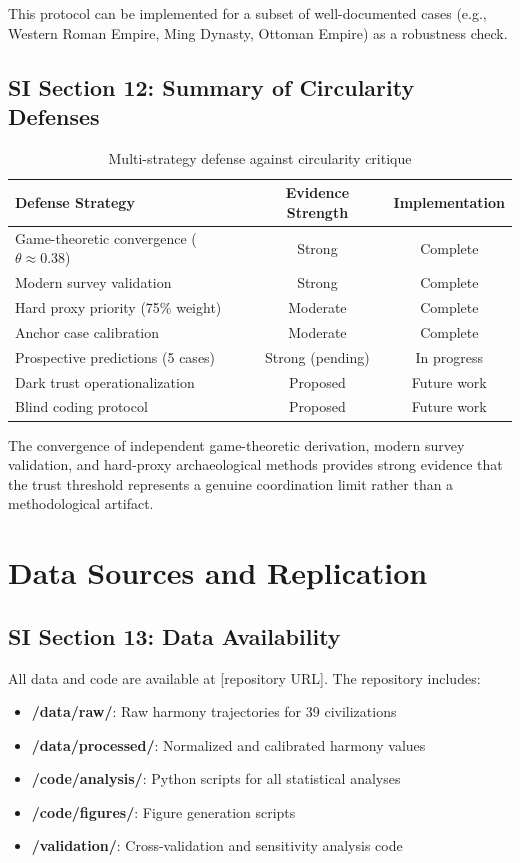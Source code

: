 \documentclass[11pt,a4paper]{article}
\begin{document}
This protocol can be implemented for a subset of well-documented cases (e.g., Western Roman Empire, Ming Dynasty, Ottoman Empire) as a robustness check.

\subsection{SI Section 12: Summary of Circularity Defenses}

\begin{table}[H]
\centering
\caption{Multi-strategy defense against circularity critique}
\begin{tabular}{lcc}
\toprule
\textbf{Defense Strategy} & \textbf{Evidence Strength} & \textbf{Implementation} \\
\midrule
Game-theoretic convergence ($\theta \approx 0.38$) & Strong & Complete \\
Modern survey validation & Strong & Complete \\
Hard proxy priority (75\% weight) & Moderate & Complete \\
Anchor case calibration & Moderate & Complete \\
Prospective predictions (5 cases) & Strong (pending) & In progress \\
Dark trust operationalization & Proposed & Future work \\
Blind coding protocol & Proposed & Future work \\
\bottomrule
\end{tabular}
\end{table}

The convergence of independent game-theoretic derivation, modern survey validation, and hard-proxy archaeological methods provides strong evidence that the trust threshold represents a genuine coordination limit rather than a methodological artifact.

\section{Data Sources and Replication}

\subsection{SI Section 13: Data Availability}

All data and code are available at [repository URL]. The repository includes:

\begin{itemize}
\item \textbf{/data/raw/}: Raw harmony trajectories for 39 civilizations
\item \textbf{/data/processed/}: Normalized and calibrated harmony values
\item \textbf{/code/analysis/}: Python scripts for all statistical analyses
\item \textbf{/code/figures/}: Figure generation scripts
\item \textbf{/validation/}: Cross-validation and sensitivity analysis code
\end{itemize}
\end{document}
